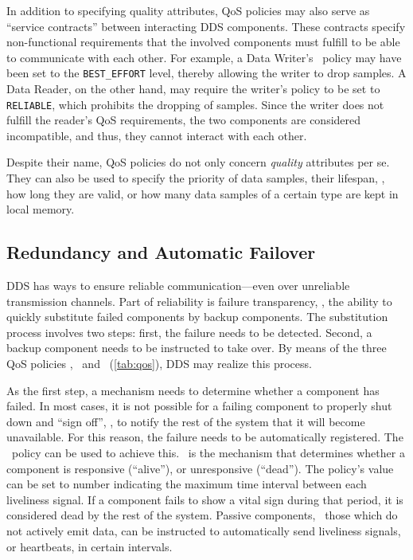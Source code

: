 In addition to specifying quality attributes, QoS policies may also serve as ``service contracts'' between interacting DDS components. These contracts specify non-functional requirements that the involved components must fulfill to be able to communicate with each other. For example, a Data Writer's \reliability\ policy may have been set to the \texttt{BEST\_EFFORT} level, thereby allowing the writer to drop samples. A Data Reader, on the other hand, may require the writer's policy to be set to \texttt{RELIABLE}, which prohibits the dropping of samples. Since the writer does not fulfill the reader's QoS requirements, the two components are considered incompatible, and thus, they cannot interact with each other.

Despite their name, QoS policies do not only concern \emph{quality} attributes per se. They can also be used to specify the priority of data samples, their lifespan, \ie , how long they are valid, or how many data samples of a certain type are kept in local memory.
%
%
%
%
%
%
%
%
%
%
%
%
\subsection{Redundancy and Automatic Failover} \label{sec:failover}
DDS has ways to ensure reliable communication---even over unreliable transmission channels. Part of reliability is failure transparency, \ie , the ability to quickly substitute failed components by backup components. The substitution process involves two steps: first, the failure needs to be detected. Second, a backup component needs to be instructed to take over. By means of the three QoS policies \ownership , \ostrength\ and \liveliness\ (\cf \autoref{tab:qos}), DDS may realize this process.

As the first step, a mechanism needs to determine whether a component has failed. In most cases, it is not possible for a failing component to properly shut down and ``sign off'', \ie , to notify the rest of the system that it will become unavailable. For this reason, the failure needs to be automatically registered. The \liveliness\ policy can be used to achieve this. \liveliness\ is the mechanism that determines whether a component is responsive (``alive''), or unresponsive (``dead''). The policy's value can be set to number indicating the maximum time interval between each liveliness signal. If a component fails to show a vital sign during that period, it is considered dead by the rest of the system. Passive components, \ie\ those which do not actively emit data, can be instructed to automatically send liveliness signals, or heartbeats, in certain intervals.

